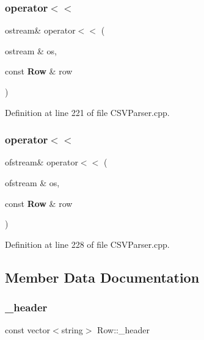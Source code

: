 \subsubsection{operator$<$$<$\hspace{0.1cm}{\footnotesize\ttfamily [1/2]}}
{\footnotesize\ttfamily ostream\& operator$<$$<$ (\begin{DoxyParamCaption}\item[{ostream \&}]{os,  }\item[{const \textbf{ Row} \&}]{row }\end{DoxyParamCaption})\hspace{0.3cm}{\ttfamily [friend]}}



Definition at line 221 of file C\+S\+V\+Parser.\+cpp.

\mbox{\label{class_row_ad4e8b6c4b0238a50bde8e99ec8a0dcb0}} 
\subsubsection{operator$<$$<$\hspace{0.1cm}{\footnotesize\ttfamily [2/2]}}
{\footnotesize\ttfamily ofstream\& operator$<$$<$ (\begin{DoxyParamCaption}\item[{ofstream \&}]{os,  }\item[{const \textbf{ Row} \&}]{row }\end{DoxyParamCaption})\hspace{0.3cm}{\ttfamily [friend]}}



Definition at line 228 of file C\+S\+V\+Parser.\+cpp.



\subsection{Member Data Documentation}
\mbox{\label{class_row_a98603a15923aa97e15198393ef3080c0}} 
\subsubsection{\+\_\+header}
{\footnotesize\ttfamily const vector$<$string$>$ Row\+::\+\_\+header\hspace{0.3cm}{\ttfamily [private]}}



